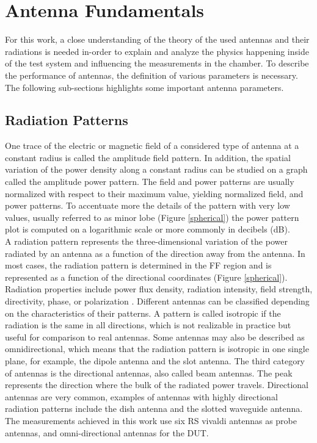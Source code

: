 \section{Antenna Fundamentals}
For this work, a close understanding of the theory of the used antennas and their radiations is needed in-order to explain and analyze the physics happening inside of the test system and influencing the measurements in the chamber. To describe the performance of antennas, the definition of various parameters is necessary. The following sub-sections highlights some important antenna parameters.

\subsection{Radiation Patterns}
One trace of the electric or magnetic field of a considered type of antenna at a constant radius is called the amplitude field pattern. In addition, the spatial variation of the power density along a constant radius can be studied on a graph called the amplitude power pattern. The field and power patterns are usually normalized with respect to their maximum value, yielding normalized field, and power patterns. To accentuate more the details of the pattern with very low values, usually referred to as minor lobe (Figure \ref{spherical}) the power pattern plot is computed on a logarithmic scale or more commonly in decibels (dB). \\

A radiation pattern represents the three-dimensional variation of the power radiated by an antenna as a function of the direction away from the antenna. In most cases, the radiation pattern is determined in the \acs{FF} region and is represented as a function of the directional coordinates (Figure \ref{spherical}). Radiation properties include power flux density, radiation intensity, field strength, directivity, phase, or polarization \cite{balanis}. Different antennas can be classified depending on the characteristics of their patterns. A pattern is called isotropic if the radiation is the same in all directions, which is not realizable in practice but useful for comparison to real antennas. Some antennas may also be described as omnidirectional, which means that the radiation pattern is isotropic in one single plane, for example, the dipole antenna and the slot antenna. The third category of antennas is the directional antennas, also called beam antennas. The peak represents the direction where the bulk of the radiated power travels. Directional antennas are very common, examples of antennas with highly directional radiation patterns include the dish antenna and the slotted waveguide antenna. The measurements achieved in this work use six \acs{RS}\textregistered{} vivaldi antennas as probe antennas, and omni-directional antennas for the \acs{DUT}. \\

